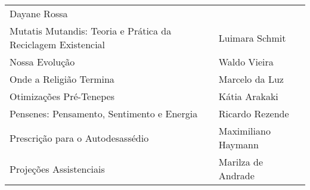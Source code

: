 \documentclass[
]{article}
\begin{document}
\begin{longtable}[]{@{}
  >{\raggedright\arraybackslash}p{}
  >{\raggedright\arraybackslash}p{}@{}}
\begin{minipage}[b]{\linewidth}
Dayane Rossa
\end{minipage} \\
\begin{minipage}[b]{\linewidth}\raggedright
Mutatis Mutandis: Teoria e Prática da Reciclagem Existencial
\end{minipage} & \begin{minipage}[b]{\linewidth}\raggedright
Luimara Schmit
\end{minipage} \\
\begin{minipage}[b]{\linewidth}\raggedright
Nossa Evolução
\end{minipage} & \begin{minipage}[b]{\linewidth}\raggedright
Waldo Vieira
\end{minipage} \\
\begin{minipage}[b]{\linewidth}\raggedright
Onde a Religião Termina
\end{minipage} & \begin{minipage}[b]{\linewidth}\raggedright
Marcelo da Luz
\end{minipage} \\
\begin{minipage}[b]{\linewidth}\raggedright
Otimizações Pré-Tenepes
\end{minipage} & \begin{minipage}[b]{\linewidth}\raggedright
Kátia Arakaki
\end{minipage} \\
\begin{minipage}[b]{\linewidth}\raggedright
Pensenes: Pensamento, Sentimento e Energia
\end{minipage} & \begin{minipage}[b]{\linewidth}\raggedright
Ricardo Rezende
\end{minipage} \\
\begin{minipage}[b]{\linewidth}\raggedright
Prescrição para o Autodesassédio
\end{minipage} & \begin{minipage}[b]{\linewidth}\raggedright
Maximiliano Haymann
\end{minipage} \\
\begin{minipage}[b]{\linewidth}\raggedright
Projeções Assistenciais
\end{minipage} & \begin{minipage}[b]{\linewidth}\raggedright
Marilza de Andrade

\end{minipage}
\end{longtable}
\end{document}

